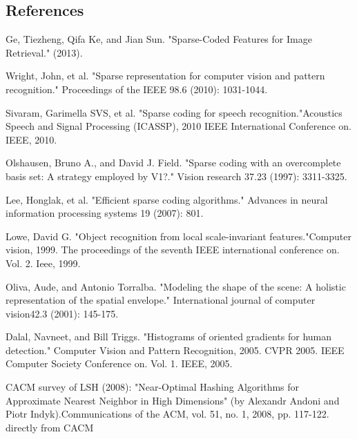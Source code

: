 \documentclass[letterpaper]{article}
\begin{document}
\subsection{References} 
Ge, Tiezheng, Qifa Ke, and Jian Sun. "Sparse-Coded Features for Image Retrieval." (2013).

Wright, John, et al. "Sparse representation for computer vision and pattern recognition." Proceedings of the IEEE 98.6 (2010): 1031-1044.

Sivaram, Garimella SVS, et al. "Sparse coding for speech recognition."Acoustics Speech and Signal Processing (ICASSP), 2010 IEEE International Conference on. IEEE, 2010.

Olshausen, Bruno A., and David J. Field. "Sparse coding with an overcomplete basis set: A strategy employed by V1?." Vision research 37.23 (1997): 3311-3325.

Lee, Honglak, et al. "Efficient sparse coding algorithms." Advances in neural information processing systems 19 (2007): 801.

Lowe, David G. "Object recognition from local scale-invariant features."Computer vision, 1999. The proceedings of the seventh IEEE international conference on. Vol. 2. Ieee, 1999.

Oliva, Aude, and Antonio Torralba. "Modeling the shape of the scene: A holistic representation of the spatial envelope." International journal of computer vision42.3 (2001): 145-175.

Dalal, Navneet, and Bill Triggs. "Histograms of oriented gradients for human detection." Computer Vision and Pattern Recognition, 2005. CVPR 2005. IEEE Computer Society Conference on. Vol. 1. IEEE, 2005.

CACM survey of LSH (2008): "Near-Optimal Hashing Algorithms for Approximate Nearest Neighbor in High Dimensions" (by Alexandr Andoni and Piotr Indyk).Communications of the ACM, vol. 51, no. 1, 2008, pp. 117-122. 
directly from CACM 


%
\end{document}
